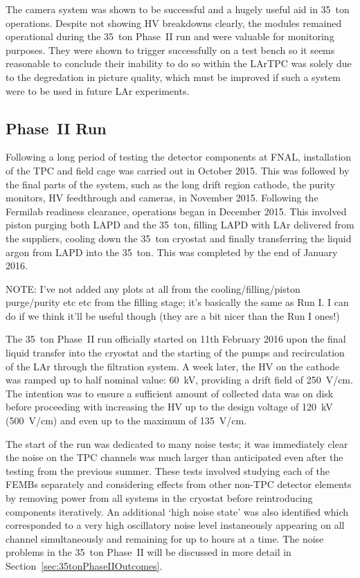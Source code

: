 The camera system was shown to be successful and a hugely useful aid in 35~ton operations.  Despite not showing HV breakdowns clearly, the modules remained operational during the 35~ton Phase~II run and were valuable for monitoring purposes.  They were shown to trigger successfully on a test bench so it seems reasonable to conclude their inability to do so within the LArTPC was solely due to the degredation in picture quality, which must be improved if such a system were to be used in future LAr experiments.

\subsection{Phase~II Run}\label{sec:35tonPhaseIIRun}

Following a long period of testing the detector components at FNAL, installation of the TPC and field cage was carried out in October 2015.  This was followed by the final parts of the system, such as the long drift region cathode, the purity monitors, HV feedthrough and cameras, in November 2015.  Following the Fermilab readiness clearance, operations began in December 2015.  This involved piston purging both LAPD and the 35~ton, filling LAPD with LAr delivered from the suppliers, cooling down the 35~ton cryostat and finally transferring the liquid argon from LAPD into the 35~ton.  This was completed by the end of January 2016.

{\color{red} NOTE: I've not added any plots at all from the cooling/filling/piston purge/purity etc etc from the filling stage; it's basically the same as Run I.  I can do if we think it'll be useful though (they are a bit nicer than the Run I ones!)}

The 35~ton Phase~II run officially started on 11th February 2016 upon the final liquid transfer into the cryostat and the starting of the pumps and recirculation of the LAr through the filtration system.  A week later, the HV on the cathode was ramped up to half nominal value: 60~kV, providing a drift field of 250~V/cm.  The intention was to ensure a sufficient amount of collected data was on disk before proceeding with increasing the HV up to the design voltage of 120~kV (500~V/cm) and even up to the maximum of 135~V/cm.

The start of the run was dedicated to many noise tests; it was immediately clear the noise on the TPC channels was much larger than anticipated even after the testing from the previous summer.  These tests involved studying each of the FEMBs separately and considering effects from other non-TPC detector elements by removing power from all systems in the cryostat before reintroducing components iteratively.  An additional `high noise state' was also identified which corresponded to a very high oscillatory noise level instaneously appearing on all channel simultaneously and remaining for up to hours at a time.  The noise problems in the 35~ton Phase~II will be discussed in more detail in Section~\ref{sec:35tonPhaseIIOutcomes}.

